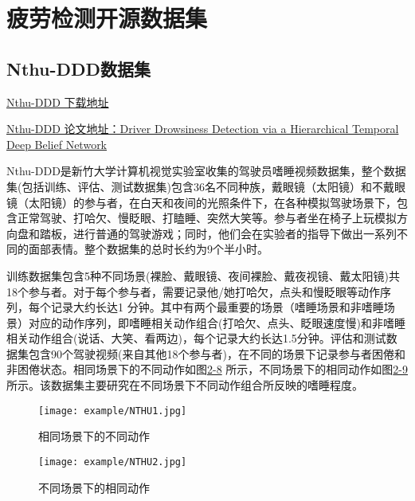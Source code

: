 \section{疲劳检测开源数据集}

\subsection{Nthu-DDD数据集}

\href{http://cv.cs.nthu.edu.tw/php/callforpaper/datasets/DDD/}{Nthu-DDD 下载地址}

\href{https://xueshu.baidu.com/usercenter/paper/show?paperid=785509793c585892cce84b2507683812&site=xueshu_se}{Nthu-DDD 论文地址：Driver Drowsiness Detection via a Hierarchical Temporal Deep Belief Network}

Nthu-DDD是新竹大学计算机视觉实验室收集的驾驶员嗜睡视频数据集，整个数据集(包括训练、评估、测试数据集)包含36名不同种族，戴眼镜（太阳镜）和不戴眼镜（太阳镜）的参与者，在白天和夜间的光照条件下，在各种模拟驾驶场景下，包含正常驾驶、打哈欠、慢眨眼、打瞌睡、突然大笑等。参与者坐在椅子上玩模拟方向盘和踏板，进行普通的驾驶游戏；同时，他们会在实验者的指导下做出一系列不同的面部表情。整个数据集的总时长约为9个半小时。

训练数据集包含5种不同场景(裸脸、戴眼镜、夜间裸脸、戴夜视镜、戴太阳镜)共18个参与者。对于每个参与者，需要记录他/她打哈欠，点头和慢眨眼等动作序列，每个记录大约长达1 分钟。其中有两个最重要的场景（嗜睡场景和非嗜睡场景）对应的动作序列，即嗜睡相关动作组合(打哈欠、点头、眨眼速度慢)和非嗜睡相关动作组合(说话、大笑、看两边)，每个记录大约长达1.5分钟。评估和测试数据集包含90个驾驶视频(来自其他18个参与者)，在不同的场景下记录参与者困倦和非困倦状态。相同场景下的不同动作如图\href{figure:2-8}{2-8} 所示，不同场景下的相同动作如图\href{figure:2-9}{2-9}所示。该数据集主要研究在不同场景下不同动作组合所反映的嗜睡程度。

\begin{figure}[!htp]

\centering
\texttt{[image: example/NTHU1.jpg]}
\caption{相同场景下的不同动作}
\label{figure:1-7}

\end{figure}

\begin{figure}[!htp]

\centering
\texttt{[image: example/NTHU2.jpg]}
\caption{不同场景下的相同动作}
\label{figure:1-7}

\end{figure}

